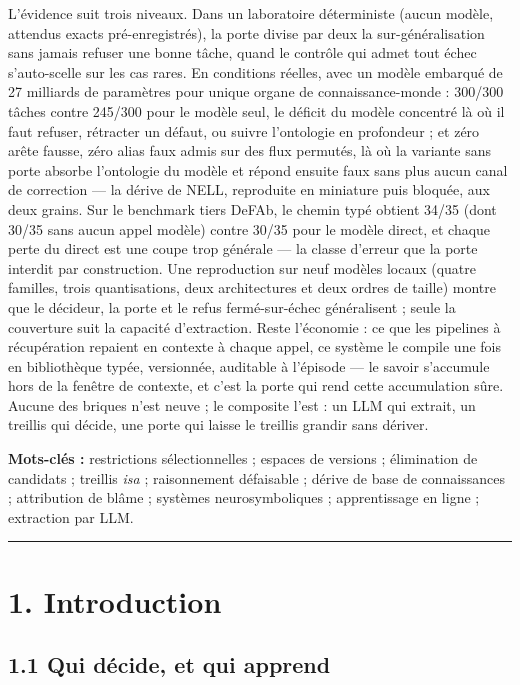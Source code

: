 \documentclass[11pt]{article}
\begin{document}
L'évidence suit trois niveaux. Dans un laboratoire déterministe (aucun modèle, attendus exacts pré-enregistrés), la porte divise par deux la sur-généralisation sans jamais refuser une bonne tâche, quand le contrôle qui admet tout échec s'auto-scelle sur les cas rares. En conditions réelles, avec un modèle embarqué de 27 milliards de paramètres pour unique organe de connaissance-monde : 300/300 tâches contre 245/300 pour le modèle seul, le déficit du modèle concentré là où il faut refuser, rétracter un défaut, ou suivre l'ontologie en profondeur ; et zéro arête fausse, zéro alias faux admis sur des flux permutés, là où la variante sans porte absorbe l'ontologie du modèle et répond ensuite faux sans plus aucun canal de correction — la dérive de NELL, reproduite en miniature puis bloquée, aux deux grains. Sur le benchmark tiers DeFAb, le chemin typé obtient 34/35 (dont 30/35 sans aucun appel modèle) contre 30/35 pour le modèle direct, et chaque perte du direct est une coupe trop générale — la classe d'erreur que la porte interdit par construction. Une reproduction sur neuf modèles locaux (quatre familles, trois quantisations, deux architectures et deux ordres de taille) montre que le décideur, la porte et le refus fermé-sur-échec généralisent ; seule la couverture suit la capacité d'extraction. Reste l'économie : ce que les pipelines à récupération repaient en contexte à chaque appel, ce système le compile une fois en bibliothèque typée, versionnée, auditable à l'épisode — le savoir s'accumule hors de la fenêtre de contexte, et c'est la porte qui rend cette accumulation sûre. Aucune des briques n'est neuve ; le composite l'est : un LLM qui extrait, un treillis qui décide, une porte qui laisse le treillis grandir sans dériver.

\textbf{Mots-clés :} restrictions sélectionnelles ; espaces de versions ; élimination de candidats ; treillis \emph{isa} ; raisonnement défaisable ; dérive de base de connaissances ; attribution de blâme ; systèmes neurosymboliques ; apprentissage en ligne ; extraction par LLM.

\medskip\hrule\medskip

\section*{1. Introduction}

\subsection*{1.1 Qui décide, et qui apprend}
\end{document}
